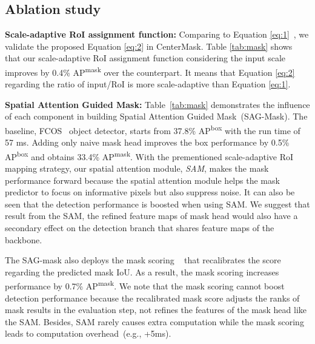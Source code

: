 \documentclass[10pt,twocolumn,letterpaper]{article}
\begin{document}
\subsection{Ablation study}
\noindent
\textbf{Scale-adaptive RoI assignment function:}
Comparing to Equation \ref{eq:1}~\cite{lin2017feature}, we validate the proposed Equation \ref{eq:2} in CenterMask.
Table \ref{tab:mask} shows that our scale-adaptive RoI assignment function considering the input scale improves by 0.4\% AP\textsuperscript{mask} over the counterpart.
It means that Equation \ref{eq:2} regarding the ratio of input/RoI is more scale-adaptive than Equation \ref{eq:1}.



\noindent
\textbf{Spatial Attention Guided Mask:}
Table~\ref{tab:mask} demonstrates the influence of each component in building Spatial Attention Guided Mask~(SAG-Mask).
The baseline, FCOS~\cite{Tian_2019_ICCV} object detector, starts from 37.8\% AP\textsuperscript{box} with the run time of 57 ms.
Adding only naive mask head improves the box performance by 0.5\% AP\textsuperscript{box} and obtains 33.4\% AP\textsuperscript{mask}.
With the prementioned scale-adaptive RoI mapping strategy, our spatial attention module, \textit{SAM}, makes the mask performance forward because the spatial attention module helps the mask predictor to focus on informative pixels but also suppress noise.
It can also be seen that the detection performance is boosted when using SAM.
We suggest that result from the SAM, the refined feature maps of mask head would also have a secondary effect on the detection branch that shares feature maps of the backbone.

The SAG-mask also deploys the mask scoring ~\cite{huang2019mask} that recalibrates the score regarding the predicted mask IoU.
As a result, the mask scoring increases performance by 0.7\% AP\textsuperscript{mask}.
We note that the mask scoring cannot boost detection performance because the recalibrated mask score adjusts the ranks of mask results in the evaluation step, not refines the features of the mask head like the SAM.
Besides, SAM rarely causes extra computation while the mask scoring leads to computation overhead~(e.g., +5ms).
\\


\begin{table}[t]
     \centering
     \caption{Feature level ranges for RoIAlign~\cite{he2017mask} in CenterMmask. P3P7 denotes the feature maps with output stride of   }
     \label{tab:level}\vspace{-0.3cm}
\end{table}
\end{document}

